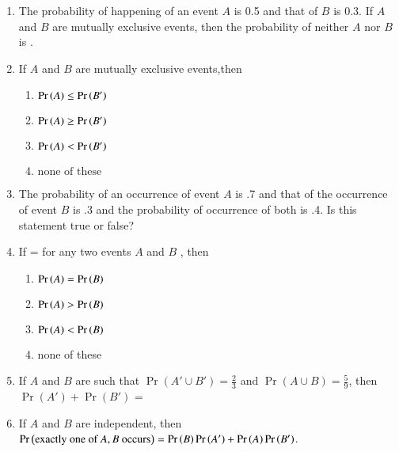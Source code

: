 \begin{enumerate}[label=\thesubsection.\arabic*,ref=\thesubsection.\theenumi,resume*]
\begin{table}[H]
\centering
	
\caption{}
\label{tab:11/16/3/11}
\end{table}
		\solution
		
\item The probability of happening of an event $A$ is 0.5 and that of $B$ is 0.3. If $A$ and $B$ are mutually exclusive events, then the probability of neither $A$ nor $B$ is \underline{\phantom{Blank}}.
	\\	
\solution
		
\item If $A$ and $B$ are mutually exclusive events,then
\begin{multicols}{2}
\begin{enumerate}
\item $\Pr\left(A\right) \leq\Pr\left(B^\prime\right)$
\item $\Pr\left(A\right) \geq \Pr\left(B^\prime\right)$
\item $\Pr\left(A\right) < \Pr\left(B^\prime\right)$
\item $\text{none of these}$
\end{enumerate}
\end{multicols}
\solution 

\item The probability of an occurrence of event $A$ is .7 and that of the occurrence of event $B$ is .3 and the probability of occurrence of both is .4. Is this statement true or false?\\
\solution

\item If  =  for any two events $A$ and $B$ , then
	\begin{multicols}{4}
\begin{enumerate}
\item $\Pr\left(A\right)=\Pr\left(B\right)$
\item $\Pr\left(A\right) > \Pr\left(B\right)$
\item $\Pr\left(A\right) < \Pr\left(B\right)$
\item none of these
\end{enumerate}
\end{multicols}
\solution

\item If $A$ and $B$ are such that 
$\Pr(A' \cup B') = \frac{2}{3}$ and $\Pr(A \cup B) = \frac{5}{9}$, 
then $\Pr(A') + \Pr(B')$ = \\
\solution

\item If $A$ and $B$ are independent, then 
	$\Pr\left(\text{exactly one of } A, B \text{ occurs}\right) =\Pr\left(B\right)\Pr\left(A^{\prime}\right)+\Pr\left(A\right)\Pr\left(B^{\prime}\right)$.\\

\end{enumerate}
